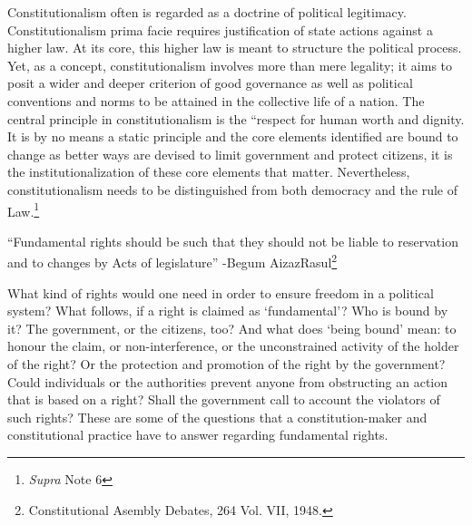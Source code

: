 \begin{multicols}{2}

\noi
Constitutionalism often is regarded as a doctrine of political legitimacy. Constitutionalism
prima facie requires justification of state actions against a higher law. At its core, this higher
law is meant to structure the political process. Yet, as a concept, constitutionalism involves
more than mere legality; it aims to posit a wider and deeper criterion of good governance as
well as political conventions and norms to be attained in the collective life of a nation. The  central principle in constitutionalism is the “respect for human worth and dignity. It is by no
means a static principle and the core elements identified are bound to change as better ways
are devised to limit government and protect citizens, it is the institutionalization of these core
elements that matter. Nevertheless, constitutionalism needs to be distinguished from both
democracy and the rule of Law.\footnote{\textit{Supra} Note 6}

\vspace{.5cm}



\vspace{-.35cm}

\noi
\begin{quoting}
“Fundamental rights should be such that they should not be liable to
reservation and to changes by Acts of legislature” -Begum AizazRasul\footnote{Constitutional Asembly Debates, 264 Vol. VII, 1948.}
\end{quoting}

\vspace{-.35cm}

\noi
What kind of rights would one need in order to ensure freedom in a political system? What
follows, if a right is claimed as ‘fundamental’? Who is bound by it? The government, or the
citizens, too? And what does ‘being bound’ mean: to honour the claim, or non-interference,
or the unconstrained activity of the holder of the right? Or the protection and promotion of
the right by the government? Could individuals or the authorities prevent anyone from
obstructing an action that is based on a right? Shall the government call to account the
violators of such rights? These are some of the questions that a constitution-maker and
constitutional practice have to answer regarding fundamental rights.

\vspace{-.1cm}


\end{multicols}
